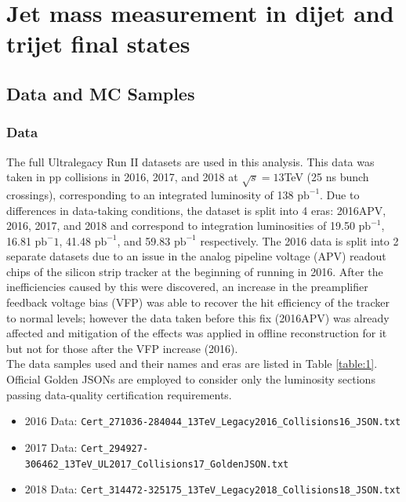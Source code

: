 \chapter{Jet mass measurement in dijet and trijet final states}\label{chap:planner}
\section{Data and MC Samples}
\subsection{Data}\label{data}
The full Ultralegacy Run II datasets are used in this analysis. This data was taken in pp collisions in 2016, 2017, and 2018 at $\sqrt{s}=13$TeV (25 ns bunch crossings), corresponding to an integrated luminosity of 138 $\text{pb}^{-1}$. Due to differences in data-taking conditions, the dataset is split into 4 eras: 2016APV, 2016, 2017, and 2018 and correspond to integration luminosities of 19.50 $\text{pb}^{-1}$, 16.81 $\text{pb}^-1$, 41.48 $\text{pb}^{-1}$, and 59.83 $\text{pb}^{-1}$ respectively. The 2016 data is split into 2 separate datasets due to an issue in the analog pipeline voltage (APV) readout chips of the silicon strip tracker at the beginning of running in 2016. After the inefficiencies caused by this were discovered, an increase in the preamplifier feedback voltage bias (VFP) was able to recover the hit efficiency of the tracker to normal levels; however the data taken before this fix (2016APV) was already affected and mitigation of the effects was applied in offline reconstruction for it but not for those after the VFP increase (2016). \\
The data samples used and their names and eras are listed in Table \ref{table:1}. \\
Official Golden JSONs are employed to consider only the luminosity sections passing data-quality certification requirements.
\begin{itemize}
\item 2016 Data: \texttt{Cert\_271036-284044\_13TeV\_Legacy2016\_Collisions16\_JSON.txt}
\item 2017 Data: \texttt{Cert\_294927-306462\_13TeV\_UL2017\_Collisions17\_GoldenJSON.txt}
\item 2018 Data: \texttt{Cert\_314472-325175\_13TeV\_Legacy2018\_Collisions18\_JSON.txt}
\end{itemize}
